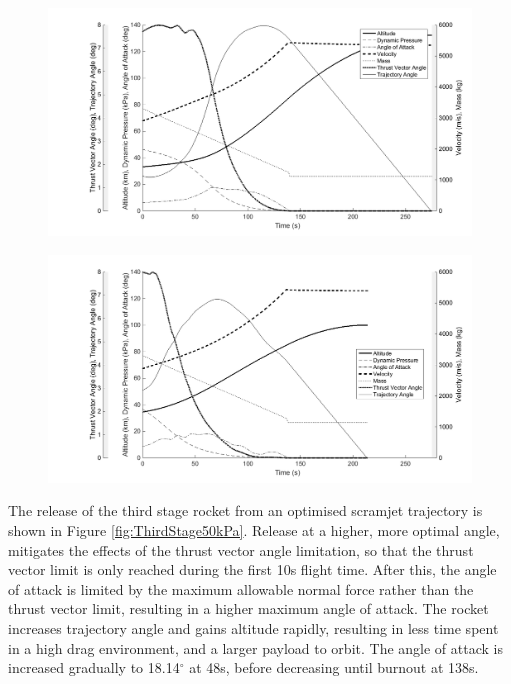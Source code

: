 \begin{figure}[h]
	\centering
	\includegraphics[width=0.9\linewidth]{figures/5_Ascent/ThirdStageConstQ}
	\caption{}
	\label{fig:ThirdStageConstQ}
\end{figure}
\begin{figure}[h]
	\centering
	\includegraphics[width=0.9\linewidth]{figures/5_Ascent/ThirdStage50kpaconstrained}
	\caption{}
	\label{fig:ThirdStage50kpaconstrained}
\end{figure}


The release of the third stage rocket from an optimised scramjet trajectory is shown in Figure \ref{fig:ThirdStage50kPa}. Release at a higher, more optimal angle, mitigates the effects of the thrust vector angle limitation, so that the thrust vector limit is only reached during the first 10s flight time. After this, the angle of attack is limited by the maximum allowable normal force rather than the thrust vector limit, resulting in a higher maximum angle of attack. The rocket increases trajectory angle and gains altitude rapidly, resulting in less time spent in a high drag environment, and a larger payload to orbit.  The angle of attack is increased gradually to 18.14$^\circ$ at 48s, before decreasing until burnout at 138s.




